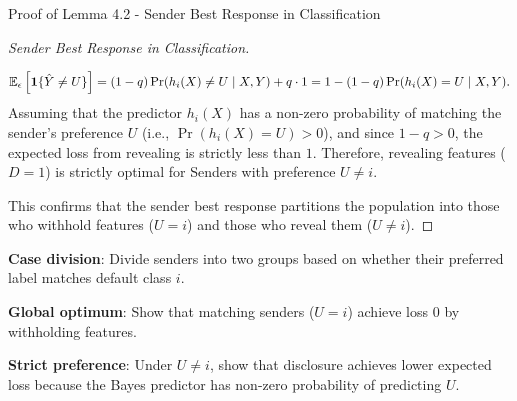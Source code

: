\begin{sourceblock}{Proof of Lemma 4.2 - Sender Best Response in Classification}
\begin{proof}[Sender Best Response in Classification]
\begin{enumerate}
    \begin{equation}
        \mathbb{E}_{\epsilon}\left[ \mathbf{1}\{\hat{Y} \ne U\} \right] = (1 - q)\Pr(h_i(X) \ne U \mid X, Y) + q \cdot 1 = 1 - (1 - q)\Pr(h_i(X) = U \mid X, Y).
    \end{equation}
    Assuming that the predictor $h_i(X)$ has a non-zero probability of matching the sender's preference $U$ (i.e., $\Pr(h_i(X) = U) > 0$), and since $1 - q > 0$, the expected loss from revealing is strictly less than $1$. Therefore, revealing features ($D = 1$) is strictly optimal for Senders with preference $U \ne i$.
\end{enumerate}
This confirms that the sender best response partitions the population into those who withhold features ($U = i$) and those who reveal them ($U \ne i$).
\end{proof}
\end{sourceblock}

\begin{guideblock}
\item \textbf{Case division}: Divide senders into two groups based on whether their preferred label matches default class $i$.
\item \textbf{Global optimum}: Show that matching senders ($U=i$) achieve loss $0$ by withholding features.
\item \textbf{Strict preference}: Under $U \ne i$, show that disclosure achieves lower expected loss because the Bayes predictor has non-zero probability of predicting $U$.
\end{guideblock}


